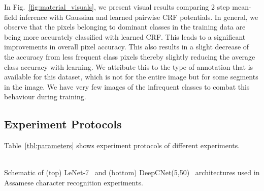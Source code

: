 In Fig.~\ref{fig:material_visuals}, we present visual results comparing 2 step
mean-field inference with Gaussian and learned pairwise CRF potentials. In
general, we observe that the pixels belonging to dominant classes in the
training data are being more accurately classified with learned CRF. This leads to
a significant improvements in overall pixel accuracy. This also results
in a slight decrease of the accuracy from less frequent class pixels thereby
slightly reducing the average class accuracy with learning. We attribute this
to the type of annotation that is available for this dataset, which is not
for the entire image but for some segments in the image. We have very few
images of the infrequent classes to combat this behaviour during training.

\subsection{Experiment Protocols}
\label{sec:protocols}

Table~\ref{tbl:parameters} shows experiment protocols of different experiments.

 \begin{figure*}[t!]
  \centering
  \\
  {Schematic of (top) LeNet-7~\cite{lecun1998mnist} and (bottom) DeepCNet(5,50)~\cite{ciresan2012multi,graham2014spatially} architectures used in Assamese
  character recognition experiments.}
\label{fig:nnrecognition}
\end{figure*}


